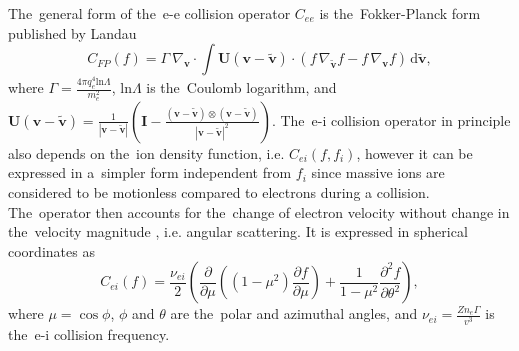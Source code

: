 \documentclass[
 aps,
 jmp,
 amsmath,amssymb,
 twocolumn,
]{revtex4-1}
\newcommand{\pdv}[2]{\frac{\partial{#1}}{\partial{#2}}}
\newcommand{\vect}[1]{\boldsymbol{#1}}
\newcommand{\matr}[1]{\mathbf{#1}}
\newcommand{\dI}{\text{d}}
\newcommand{\Zbar}{Z}
\newcommand{\nue}{\nu_{e}}
\newcommand{\nuei}{\nu_{ei}}
\newcommand{\vmag}{v}
\newcommand{\vth}{v_{th}}
\newcommand{\qe}{q_e}
\newcommand{\me}{m_e}
\newcommand{\kB}{k_B}
\newcommand{\vv}{\vect{v}}
\newcommand{\vvb}{\tilde{\vect{v}}}
\newcommand{\gv}{\nabla_{\vv}}
\newcommand{\gvb}{\nabla_{\vvb}}
\newcommand{\ft}{f}
\newcommand{\lnc}{\text{ln}\Lambda}
\begin{document}
The~general form of the~e-e collision operator 
$C_{ee}$ is the~Fokker-Planck form published by Landau \cite{Landau_1936}
\begin{equation}
  C_{FP}(\ft) =
  \Gamma~\gv\cdot\int \matr{U}(\vv - \vvb) \cdot \left(
  \ft\, \gvb \ft - \ft\, \gv \ft \right)\, \dI\vvb ,
  \label{eq:LFP_model}
\end{equation}
where $\Gamma = \frac{4\pi\qe^4\lnc}{\me^2}$, $\lnc$ is the~Coulomb logarithm,
and $\matr{U}(\vv - \vvb) = \frac{1}{|\vv - \vvb|}\left(\matr{I} - \frac{(\vv - \vvb)\otimes (\vv - \vvb)}{|\vv - \vvb|^2}\right)$.
The~e-i collision operator in principle also depends 
on the~ion density function, i.e. $C_{ei}(\ft, \ft_i)$, however it 
can be expressed in a~simpler form independent from $\ft_i$
since massive ions are considered 
to be motionless compared to electrons during a collision. 
The~operator then accounts
for the~change of electron velocity without change in the~velocity magnitude
, i.e. angular scattering. 
It is expressed in spherical coordinates as
\begin{equation}
  C_{ei}(\ft) = \frac{\nuei}{2}
  \left(\pdv{}{\mu}\left((1 - \mu^2)\pdv{\ft}{\mu}\right)
  + \frac{1}{1 - \mu^2}\frac{\partial^2 \ft}{\partial\theta^2} \right) ,
  \label{eq:ei_scattering}
\end{equation}
where $\mu = \cos\phi$, $\phi$ and $\theta$ are the~polar and azimuthal 
angles, and $\nuei = \frac{\Zbar n_e \Gamma}{\vmag^3}$ is the~e-i
collision frequency.

 %
\end{document}

